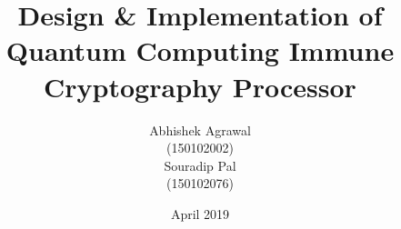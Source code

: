 

\clearpage{}  %


\title{Design \& Implementation of Quantum Computing Immune Cryptography Processor}
\author{Abhishek Agrawal\\(150102002)\\Souradip Pal\\(150102076)}
\date{April 2019}



\thesis



\maketitle



